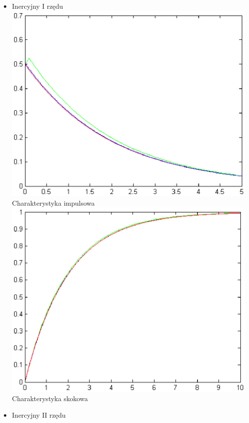 \documentclass[a4paper,10pt]{article}
\begin{document}
\begin{itemize}
\newpage 
\begin{itemize}
\item Inercyjny I rzędu
\newline \includegraphics[scale=0.9]{CW1-inercyjny1-mimpuls.eps}\newline Charakterystyka impulsowa
\newline \includegraphics[scale=0.9]{CW1-inercyjny1-mskok.eps}\newline Charakterystyka skokowa
\newpage  
\item Inercyjny II rzędu

\end{itemize}
\end{itemize}
\end{document}
